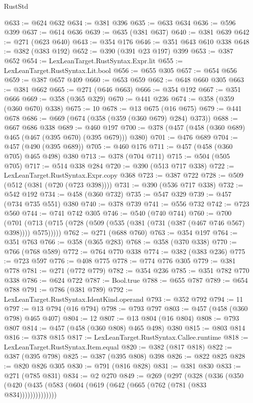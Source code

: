 \begin{lexlean}{RustStd}
\begin{coremodule}
@633 := @624 @632
@634 := @381 @396
@635 := @633 @634
@636 := @596 @399
@637 := @614 @636
@639 := @635 (@381 @637)
@640 := @381 @639
@642 := @271 (@623 @640)
@643 := @354 @176
@646 := @351 @643 @610 @338
@648 := @382 (@383 @192)
@652 := @390 (@391 @23 @197) @399
@653 := @387 @652
@654 := LexLeanTarget.RustSyntax.Expr.lit
@655 := LexLeanTarget.RustSyntax.Lit.bool
@656 := @655 @305
@657 := @654 @656
@659 := @387 @657 @409
@660 := @653 @659
@662 := @648 @660 @305
@663 := @381 @662
@665 := @271 (@646 @663)
@666 := @354 @192
@667 := @351 @666
@669 := @358 (@365 @329)
@670 := @441 @236
@674 := @358 (@359 (@360 @670) @338)
@675 := 10
@678 := @13 @675 (@16 @675)
@679 := @441 @678
@686 := @669 (@674 (@358 (@359 (@360 @679) @284) @373))
@688 := @667 @686 @338
@689 := @460 @197
@700 := @378 (@457 (@458 (@360 @689) @465 (@467 (@395 @670) (@395 @679))) @380)
@701 := @476 @689
@704 := @457 (@490 (@395 @689))
@705 := @460 @176
@711 := @457 (@458 (@360 @705) @465 @498) @380
@713 := @378 (@704 @711)
@715 := @504 (@505 @705)
@717 := @514 @338 @284
@720 := @390 (@513 @717 @338)
@722 := LexLeanTarget.RustSyntax.Expr.copy @368
@723 := @387 @722
@728 := @509 (@512 (@381 (@720 (@723 @398))))
@731 := @390 (@536 @717 @338)
@732 := @542 @192
@734 := @458 (@360 @732)
@735 := @547 @329
@739 := @457 (@734 @735 @551) @380
@740 := @378 @739
@741 := @556 @732
@742 := @723 @560
@744 := @741 @742 @305
@746 := @540 (@740 @744)
@760 := @700
    (@701 (@713 (@715 (@728 (@509 (@535 (@381 (@731 (@387 (@467 @746 @567) @398)))) @575)))))
@762 := @271 (@688 @760)
@763 := @354 @197
@764 := @351 @763
@766 := @358 (@365 @283)
@768 := @358 (@370 @338)
@770 := @766 (@768 @589)
@772 := @764 @770 @338
@774 := @382 (@383 @236)
@775 := @723 @597
@776 := @408 @775
@778 := @774 @776 @305
@779 := @381 @778
@781 := @271 (@772 @779)
@782 := @354 @236
@785 := @351 @782 @770 @338
@786 := @624 @722
@787 := Bool.true
@788 := @655 @787
@789 := @654 @788
@791 := @786 (@381 @789)
@792 := LexLeanTarget.RustSyntax.IdentKind.operand
@793 := @352 @792
@794 := 11
@797 := @13 @794 (@16 @794)
@798 := @793 @797
@803 := @457 (@458 (@360 @798) @465 @407)
@804 := 12
@807 := @13 @804 (@16 @804)
@808 := @793 @807
@814 := @457 (@458 (@360 @808) @465 @498) @380
@815 := @803 @814
@816 := @378 @815
@817 := LexLeanTarget.RustSyntax.Callee.runtime
@818 := LexLeanTarget.RustSyntax.Item.equal
@820 := @382 (@817 @818)
@822 := @387 (@395 @798)
@825 := @387 (@395 @808) @398
@826 := @822 @825
@828 := @820 @826 @305
@830 := @791 (@816 @828)
@831 := @381 @830
@833 := @271 (@785 @831)
@834 := @2 @270
@849 := @269
    (@297
      (@328
        (@336 (@350 (@420 (@435 (@583 (@604 (@619 (@642 (@665 (@762 (@781 (@833 @834))))))))))))))

\end{coremodule}
\end{lexlean}
